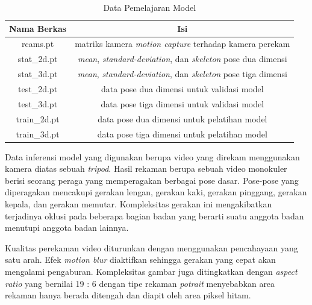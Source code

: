 \begin{table}[htbp]
    \captionsetup{labelfont=bf, textfont=bf}
    \caption{Data Pemelajaran Model}
    \label{tab:datapelatihanmodel}
    \vspace{-20pt}
    \begin{center}
        \begin{tabular}{|c|c|}
            \hline
            Nama Berkas  & Isi                                                                                 \\ \hline
            rcams.pt     & matriks kamera \textit{motion capture} terhadap kamera perekam                      \\ \hline
            stat\_2d.pt  & \textit{mean}, \textit{standard-deviation}, dan \textit{skeleton} pose dua dimensi  \\ \hline
            stat\_3d.pt  & \textit{mean}, \textit{standard-deviation}, dan \textit{skeleton} pose tiga dimensi \\ \hline
            test\_2d.pt  & data pose dua dimensi untuk validasi model                                          \\ \hline
            test\_3d.pt  & data pose tiga dimensi untuk validasi model                                         \\ \hline
            train\_2d.pt & data pose dua dimensi untuk pelatihan model                                         \\ \hline
            train\_3d.pt & data pose tiga dimensi untuk pelatihan model                                        \\ \hline
        \end{tabular}
    \end{center}
    \vspace{-10pt}
\end{table}

Data inferensi model yang digunakan berupa video yang direkam menggunakan kamera diatas sebuah
\textit{tripod}. Hasil rekaman berupa sebuah video monokuler berisi seorang peraga yang memperagakan
berbagai pose dasar. Pose-pose yang diperagakan mencakupi gerakan lengan, gerakan kaki, gerakan pinggang,
gerakan kepala, dan gerakan memutar. Kompleksitas gerakan ini mengakibatkan terjadinya oklusi pada
beberapa bagian badan yang berarti suatu anggota badan menutupi anggota badan lainnya.

Kualitas perekaman video diturunkan dengan menggunakan pencahayaan yang satu arah.
Efek \textit{motion blur} diaktifkan sehingga gerakan yang cepat akan mengalami pengaburan.
Kompleksitas gambar juga ditingkatkan dengan
\textit{aspect ratio} yang bernilai 19 : 6 dengan tipe rekaman \textit{potrait} menyebabkan area rekaman
hanya berada ditengah dan diapit oleh area piksel hitam.


